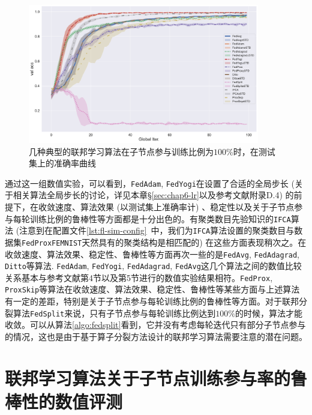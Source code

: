 \begin{figure}[ht]
    \centering
    \includegraphics[width=0.9\textwidth]{figures/standard-test-ratio-70-val-acc.pdf}
    \caption{几种典型的联邦学习算法在子节点参与训练比例为$100\%$时，在测试集上的准确率曲线}
    \label{fig:standard-test-ratio-100-val-acc}
\end{figure}

通过这一组数值实验，可以看到，\texttt{FedAdam}, \texttt{FedYogi}在设置了合适的全局步长 (关于相关算法全局步长的讨论，详见本章\S\ref{sec:chap6-lr}以及参考文献\parencite{reddi2020fed_opt}附录D.4) 的前提下，在收敛速度、算法效果 (以测试集上准确率计) 、稳定性以及关于子节点参与每轮训练比例的鲁棒性等方面都是十分出色的。有聚类数目先验知识的\texttt{IFCA}算法 (注意到在配置文件\ref{lst:fl-sim-config}~中，我们为\texttt{IFCA}算法设置的聚类数目与数据集\texttt{FedProxFEMNIST}天然具有的聚类结构是相匹配的) 在这些方面表现稍次之。在收敛速度、算法效果、稳定性、鲁棒性等方面再次一些的是\texttt{FedAvg}, \texttt{FedAdagrad}, \texttt{Ditto}等算法. \texttt{FedAdam}, \texttt{FedYogi}, \texttt{FedAdagrad}, \texttt{FedAvg}这几个算法之间的数值比较关系基本与参考文献\parencite{reddi2020fed_opt}第4节以及第5节进行的数值实验结果相符。\texttt{FedProx}, \texttt{ProxSkip}等算法在收敛速度、算法效果、稳定性、鲁棒性等某些方面与上述算法有一定的差距，特别是关于子节点参与每轮训练比例的鲁棒性等方面。对于联邦分裂算法\texttt{FedSplit}来说，只有子节点参与每轮训练比例达到$100\%$的时候，算法才能收敛。可以从算法\ref{algo:fedsplit}看到，它并没有考虑每轮迭代只有部分子节点参与的情况，这也是由于基于算子分裂方法设计的联邦学习算法需要注意的潜在问题。


\section{联邦学习算法关于子节点训练参与率的鲁棒性的数值评测}
\label{sec:chap6-sample}

